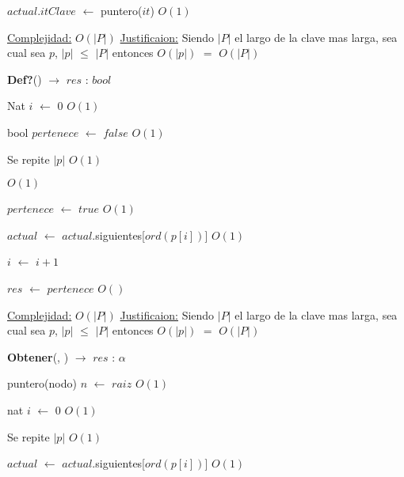 \begin{Algoritmos}
\begin{algorithm}[H]
\begin{algorithmic}[1]
	\State $actual$.$itClave$ $\gets$ puntero($it$) \Comment $O(1)$
\EndIf

\medskip
\State \underline{Complejidad:} $O(|P|)$
\State \underline{Justificaion:} Siendo $|P|$ el largo de la clave mas larga, sea cual sea $p$, $|p|$ $\leq$ $|P|$ entonces 	$O(|p|)$ $=$ $O(|P|)$


\end{algorithmic}
\end{algorithm}  
  
  
\begin{algorithm}[H]
{\textbf{Def?}() $\to$ $res$ : $bool$}
\begin{algorithmic}[1]

\State Nat $i$ $\gets$ $0$ \Comment $O(1)$

\State bool $pertenece$ $\gets$ $false$ \Comment $O(1)$

   \Comment Se repite $|p|$ $O(1)$
		
	
	 \Comment $O(1)$

		\State $pertenece$ $\gets$ $true$ \Comment $O(1)$	 
	
	\EndIf
	
	\State $actual$ $\gets$ $actual$.siguientes[$ord(p[i])$] \Comment $O(1)$

	\State $i$ $\gets$ $i + 1$
\EndWhile 

\State $res$ $\gets$ $pertenece$ \Comment $O()$ 

\medskip
\State \underline{Complejidad:} $O(|P|)$
\State \underline{Justificaion:} Siendo $|P|$ el largo de la clave mas larga, sea cual sea $p$, $|p|$ $\leq$ $|P|$ entonces 	$O(|p|)$ $=$ $O(|P|)$

\end{algorithmic}
\end{algorithm}
  
\begin{algorithm}[H]
{\textbf{Obtener}(, }) $\to$ $res$ : $\alpha$
\begin{algorithmic}[1]

\State puntero(nodo) $n$ $\gets$ $raiz$ \Comment $O(1)$

\State nat $i$ $\gets$ $0$ \Comment $O(1)$


   \Comment Se repite $|p|$ $O(1)$
		

	\State $actual$ $\gets$ $actual$.siguientes[$ord(p[i])$] \Comment $O(1)$


\end{algorithmic}
\end{algorithm}
\end{Algoritmos}
